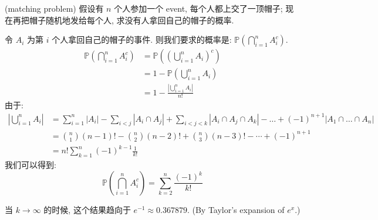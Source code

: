 \begin{example}{(matching problem)}
假设有 \(n\) 个人参加一个 event, 每个人都上交了一顶帽子; 现在再把帽子随机地发给每个人, 求没有人拿回自己的帽子的概率.
\begin{solution}
令 $A_i$ 为第 $i$ 个人拿回自己的帽子的事件. 则我们要求的概率是: $\mathbb{P}(\bigcap_{i=1}^n A_i^c)$.
\begin{align*}
\mathbb{P}(\bigcap_{i=1}^n A_i^c) &= \mathbb{P}((\bigcup_{i=1}^n A_i)^c) \\
&= 1- \mathbb{P}(\bigcup_{i=1}^n A_i)\\
&= 1- \frac{|\bigcup_{i=1}^n A_i|}{n!}
\end{align*}
由于: 
\begin{align*}
|\bigcup_{i=1}^n A_i| &= \sum_{i=1}^n\left|A_i\right|-\sum_{i<j}\left|A_i \cap A_j\right|+\sum_{i<j<k}\left|A_i \cap A_j \cap A_k\right|-\ldots+(-1)^{n+1}\left|A_1 \cap \ldots \cap A_n\right| \\
&= \binom{n}{1}(n-1)!-\binom{n}{2}(n-2)!+\binom{n}{3}(n-3)!-\cdots+(-1)^{n+1}\\
&= n!\sum_{k=1}^n(-1)^{k-1} \frac{1}{k!}
\end{align*}
我们可以得到: 
\[
\mathbb{P}(\bigcap_{i=1}^n A_i^c)  = \sum_{k=2}^n \frac{(-1)^k}{k!}
\]
\end{solution}
\end{example}
\begin{remark}
当 $k\to\infty$ 的时候, 这个结果趋向于 $e^{-1} \approx 0.367879$. (By Taylor's expansion of $e^x$.)
\end{remark}





